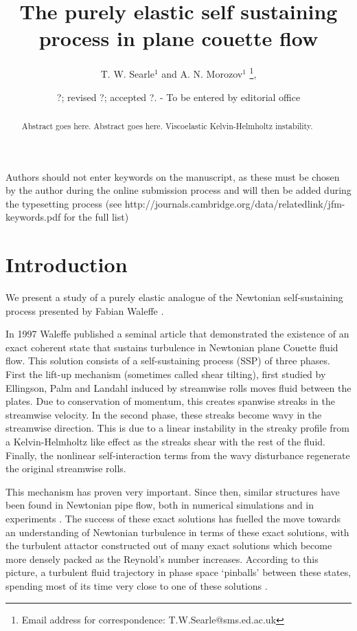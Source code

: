 \documentclass{jfm}
\title[The purely elastic self sustaining process in plane couette flow]{The purely elastic self sustaining process in plane couette flow}
\author[T. W. Searle and A. N. Morozov]%
{T. W. Searle$^1$ and A. N. Morozov$^1$%
  \thanks{Email address for correspondence: T.W.Searle@sms.ed.ac.uk},\ns
}
\affiliation{$^1$SUPA, School of Physics and Astronomy, University of Edinburgh, Mayfield Road,
Edinburgh, EH9 3JZ, UK\\[\affilskip]
}
\date{?; revised ?; accepted ?. - To be entered by editorial office}
\begin{document}
\maketitle

\begin{abstract}
  Abstract goes here. Abstract goes here. Viscoelastic Kelvin-Helmholtz instability. 
\end{abstract}

\begin{keywords}
Authors should not enter keywords on the manuscript, as these must be chosen by
the author during the online submission process and will then be added during
the typesetting process (see
http://journals.cambridge.org/data/\linebreak[3]relatedlink/jfm-\linebreak[3]keywords.pdf
for the full list)
\end{keywords}

\section{Introduction}\label{sec:intro}

We present a study of a purely elastic analogue of the Newtonian
self-sustaining process presented by Fabian Waleffe \cite{Waleffe1997}.

In 1997 Waleffe published a seminal article that demonstrated the existence of
an exact coherent state that sustains turbulence in Newtonian plane Couette
fluid flow. This solution consists of a self-sustaining process (SSP) of three
phases. First the lift-up mechanism (sometimes called shear tilting), first
studied by Ellingson, Palm and Landahl \cite{Ellingson1970, Landahl1980}
induced by streamwise rolls moves fluid between the plates. Due to conservation
of momentum, this creates spanwise streaks in the streamwise velocity. In the
second phase, these streaks become wavy in the streamwise direction. This is
due to a linear instability in the streaky profile from a Kelvin-Helmholtz like
effect as the streaks shear with the rest of the fluid. Finally, the nonlinear
self-interaction terms from the wavy disturbance regenerate the original
streamwise rolls.

This mechanism has proven very important. Since then, similar structures have
been found in Newtonian pipe flow, both in numerical simulations \cite{PIPEECS}
and in experiments \cite{PIPEECSEXP}. The success of these exact solutions has
fuelled the move towards an understanding of Newtonian turbulence in terms of
these exact solutions, with the turbulent attactor constructed out of many
exact solutions which become more densely packed as the Reynold's number
increases. According to this picture, a turbulent fluid trajectory in phase
space `pinballs' between these states, spending most of its time very close to
one of these solutions \cite{NOIDEA}.
\end{document}
